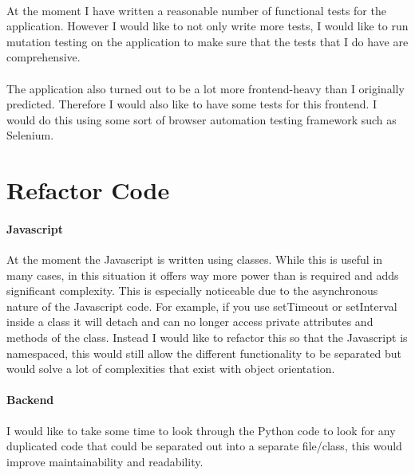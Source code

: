 \documentclass[10pt]{report}
\begin{document}
    \paragraph{}
    At the moment I have written a reasonable number of functional tests for the application.  However I
    would like to not only write more tests, I would like to run mutation testing on the application to
    make sure that the tests that I do have are comprehensive.
    
    \paragraph{}
    The application also turned out to be a lot more frontend-heavy than I originally predicted. Therefore
    I would also like to have some tests for this frontend.  I would do this using some sort of browser
    automation testing framework such as Selenium.
    
    \section*{Refactor Code}
    \paragraph{Javascript}
    At the moment the Javascript is written using classes.  While this is useful in many
    cases, in this situation it offers way more power than is required and adds significant complexity.
    This is especially noticeable due to the asynchronous nature of the Javascript code.  For example, if
    you use setTimeout or setInterval inside a class it will detach and can no longer access private
    attributes and methods of the class. Instead I would like to refactor this so that the Javascript is
    namespaced, this would still allow the different functionality to be separated but would solve a lot
    of complexities that exist with object orientation.
    
    \paragraph{Backend}
    I would like to take some time to look through the Python code to look for any duplicated code that
    could be separated out into a separate file/class, this would improve maintainability and readability.
\end{document}
